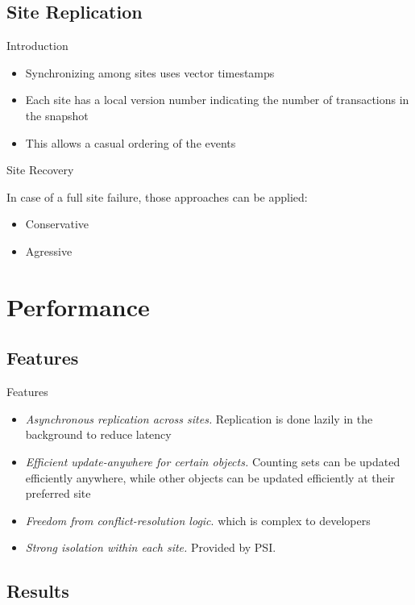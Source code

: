 \documentclass{beamer}
\begin{document}
	\subsection{Site Replication}
	 	
	 	
		\begin{frame}{Introduction}
				
		\begin{itemize}
		
		\item Synchronizing among sites uses vector timestamps
		\item Each site has a local version number indicating the number of transactions in the snapshot
		\item This allows a casual ordering of the events
		
		\end{itemize}
		
		\end{frame}	 	
		
		\begin{frame}{Site Recovery}
		
		In case of a full site failure, those approaches can be applied:
		\begin{itemize}
		\item Conservative
		\item Agressive
		\end{itemize}		
		
		\end{frame}	 	
 	
 	
\section{Performance}

	\subsection{Features}
	
	\begin{frame}{Features}
	
		\begin{itemize}
		\item \textit{Asynchronous replication across sites.} Replication is done lazily in the background to reduce latency
		\item \textit{Efficient update-anywhere for certain objects.} Counting sets can be updated efficiently anywhere, while other objects can be updated efficiently at their preferred site
		\item \textit{Freedom from conflict-resolution logic}. which is complex to developers
		\item \textit{Strong isolation within each site.} Provided by PSI.
		\end{itemize}
	\end{frame}

	\subsection{Results}	
\end{document}
